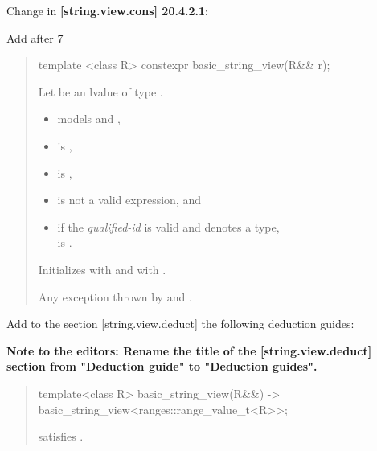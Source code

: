 \documentclass{wg21}
\begin{document}
Change in \textbf{[string.view.cons] 20.4.2.1}:

Add after 7

\begin{quote}
\begin{addedblock}
\begin{itemdecl}
template <class R>
constexpr basic_string_view(R&& r);

\end{itemdecl}

\begin{itemdescr}
    Let  be an lvalue of type .
    
    \constraints
    \begin{itemize}
        \item {} models  and ,
        \item {} is ,
        \item {} is ,
        \item {} is not a valid expression, and
        \item if the \emph{qualified-id}  is valid and denotes a type,\\  is .
    \end{itemize}


    \effects
    Initializes  with  and  with .


    \throws
    Any exception thrown by  and .



\end{itemdescr}

\end{addedblock}
\end{quote}


Add to the section [string.view.deduct] the following deduction guides:

\textbf{Note to the editors: Rename the title of the [string.view.deduct] section from "Deduction guide" to "Deduction guides".}


\begin{quote}
\begin{addedblock}

\begin{itemdecl}
template<class R>
basic_string_view(R&&)
-> basic_string_view<ranges::range_value_t<R>>;
\end{itemdecl}
\begin{itemdescr}
\constraints
{} satisfies .
\end{itemdescr}

\end{addedblock}
\end{quote}
\end{document}
